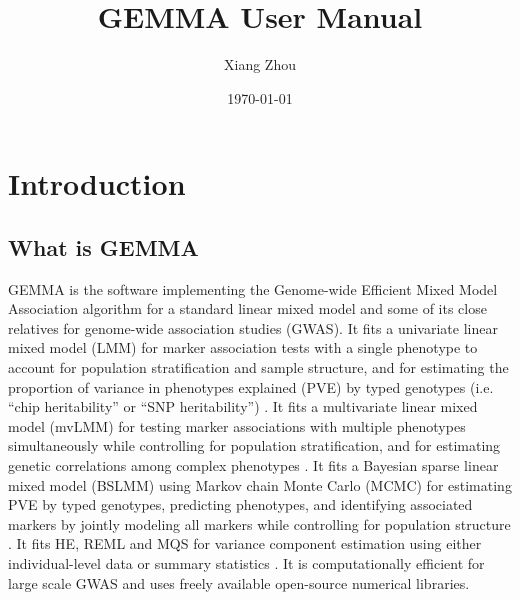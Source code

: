 \documentclass[11pt]{article}
\title{GEMMA User Manual}
\author{Xiang Zhou}
\date{\today}
\begin{document}
\maketitle

\tableofcontents

\newpage

\section{Introduction}

\subsection{What is GEMMA}

GEMMA is the software implementing the Genome-wide Efficient Mixed
Model Association algorithm \cite{Zhou:2012} for a standard linear
mixed model and some of its close relatives for genome-wide
association studies (GWAS). It fits a univariate linear mixed model
(LMM) for marker association tests with a single phenotype to account
for population stratification and sample structure, and for estimating
the proportion of variance in phenotypes explained (PVE) by typed
genotypes (i.e. ``chip heritability'' or ``SNP heritability'') \cite{Zhou:2012}. It fits a
multivariate linear mixed model (mvLMM) for testing marker
associations with multiple phenotypes simultaneously while controlling
for population stratification, and for estimating genetic correlations
among complex phenotypes \cite{Zhou:2014}. It fits a Bayesian sparse
linear mixed model (BSLMM) using Markov chain Monte Carlo (MCMC) for
estimating PVE by typed genotypes, predicting phenotypes, and
identifying associated markers by jointly modeling all markers while
controlling for population structure \cite{Zhou:2013}. It fits HE,
REML and MQS for variance component estimation using either
individual-level data or summary statistics \cite{Zhou:2016}. It is
computationally efficient for large scale GWAS and uses freely
available open-source numerical libraries.
\end{document}
